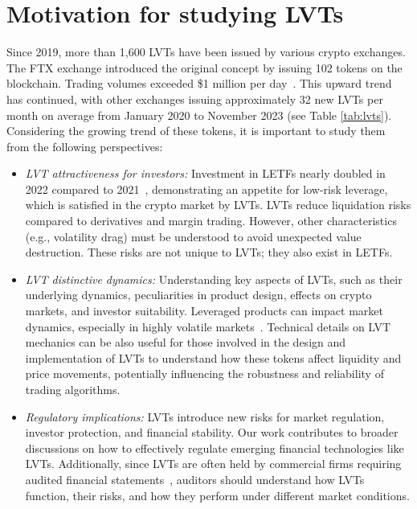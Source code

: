 \section{Motivation for studying LVTs}
Since 2019, more than 1,600 LVTs have been issued by various crypto exchanges. The FTX exchange introduced the original concept by issuing 102 tokens on the blockchain. Trading volumes exceeded \$1 million per day~\cite{TradingVolume}. This upward trend has continued, with other exchanges issuing approximately 32 new LVTs per month on average from January 2020 to November 2023 (see Table \ref{tab:lvts}). Considering the growing trend of these tokens, it is important to study them from the following perspectives:

\begin{itemize}
	\item \textsl{LVT attractiveness for investors:} Investment in LETFs nearly doubled in 2022 compared to 2021~\cite{FT_LETF}, demonstrating an appetite for low-risk leverage, which is satisfied in the crypto market by LVTs. LVTs reduce liquidation risks compared to derivatives and margin trading. However, other characteristics (e.g., volatility drag) must be understood to avoid unexpected value destruction. These risks are not unique to LVTs; they also exist in LETFs.
	
	\item \textsl{LVT distinctive dynamics:} Understanding key aspects of LVTs, such as their underlying dynamics, peculiarities in product design, effects on crypto markets, and investor suitability. Leveraged products can impact market dynamics, especially in highly volatile markets~\cite{shum2016intraday}. Technical details on LVT mechanics can be also useful for those involved in the design and implementation of LVTs to understand how these tokens affect liquidity and price movements, potentially influencing the robustness and reliability of trading algorithms.
	
	\item \textsl{Regulatory implications:} LVTs introduce new risks for market regulation, investor protection, and financial stability. Our work contributes to broader discussions on how to effectively regulate emerging financial technologies like LVTs. Additionally, since LVTs are often held by commercial firms requiring audited financial statements~\cite{devault2021blessing}, auditors should understand how LVTs function, their risks, and how they perform under different market conditions.
\end{itemize}

